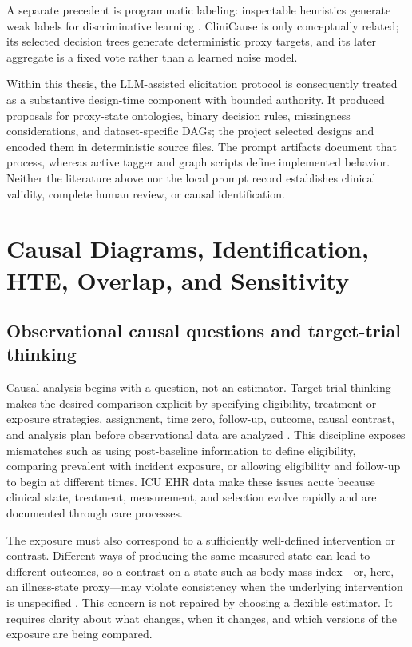 A separate precedent is programmatic labeling: inspectable heuristics generate weak labels for discriminative learning \cite{ratner_et_al_2016_data_programming}.  CliniCause is only conceptually related; its selected decision trees generate deterministic proxy targets, and its later aggregate is a fixed vote rather than a learned noise model.

Within this thesis, the LLM-assisted elicitation protocol is consequently treated as a substantive design-time component with bounded authority.  It produced proposals for proxy-state ontologies, binary decision rules, missingness considerations, and dataset-specific DAGs; the project selected designs and encoded them in deterministic source files.  The prompt artifacts document that process, whereas active tagger and graph scripts define implemented behavior.  Neither the literature above nor the local prompt record establishes clinical validity, complete human review, or causal identification.

\section{Causal Diagrams, Identification, HTE, Overlap, and Sensitivity}
\label{sec:background-related-work:causal-diagrams-identification-hte-overlap-sensitivity}

\subsection{Observational causal questions and target-trial thinking}

Causal analysis begins with a question, not an estimator.  Target-trial thinking makes the desired comparison explicit by specifying eligibility, treatment or exposure strategies, assignment, time zero, follow-up, outcome, causal contrast, and analysis plan before observational data are analyzed \cite{hernan_robins_2016_target_trial}.  This discipline exposes mismatches such as using post-baseline information to define eligibility, comparing prevalent with incident exposure, or allowing eligibility and follow-up to begin at different times.  ICU EHR data make these issues acute because clinical state, treatment, measurement, and selection evolve rapidly and are documented through care processes.

The exposure must also correspond to a sufficiently well-defined intervention or contrast.  Different ways of producing the same measured state can lead to different outcomes, so a contrast on a state such as body mass index---or, here, an illness-state proxy---may violate consistency when the underlying intervention is unspecified \cite{hernan_taubman_2008_well_defined_interventions}.  This concern is not repaired by choosing a flexible estimator.  It requires clarity about what changes, when it changes, and which versions of the exposure are being compared.

